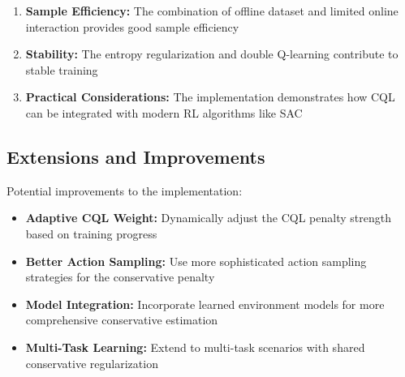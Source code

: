 \documentclass[12pt]{article}
\begin{document}
{{\begin{enumerate}
    \item \textbf{Sample Efficiency:} The combination of offline dataset and limited online interaction provides good sample efficiency
    
    \item \textbf{Stability:} The entropy regularization and double Q-learning contribute to stable training
    
    \item \textbf{Practical Considerations:} The implementation demonstrates how CQL can be integrated with modern RL algorithms like SAC
\end{enumerate}

\subsection{Extensions and Improvements}

Potential improvements to the implementation:
\begin{itemize}
    \item \textbf{Adaptive CQL Weight:} Dynamically adjust the CQL penalty strength based on training progress
    \item \textbf{Better Action Sampling:} Use more sophisticated action sampling strategies for the conservative penalty
    \item \textbf{Model Integration:} Incorporate learned environment models for more comprehensive conservative estimation
    \item \textbf{Multi-Task Learning:} Extend to multi-task scenarios with shared conservative regularization
\end{itemize}

}}


\newpage

{}

\end{document}
